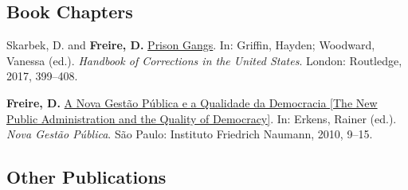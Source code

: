 \documentclass[a4paper]{article}
\renewenvironment{itemize}{
	\begin{list}{}{
			\setlength{\leftmargin}{1.5em}
		}
		}{
	\end{list}
}
\begin{document}
\subsection*{Book Chapters}

\begin{itemize}
\item Skarbek, D. and \textbf{Freire, D.} \href{https://osf.io/kuqqx/}{Prison Gangs}. In: Griffin, Hayden; Woodward, Vanessa (ed.). \textit{Handbook of Corrections in the United States}. London: Routledge, 2017, 399--408.
\item \textbf{Freire, D.} \href{https://fnst.org/sites/default/files/uploads/2017/12/08/ngp.pdf}{A Nova Gest\~{a}o P\'{u}blica e a Qualidade da Democracia {[}The New Public Administration and the Quality of Democracy{]}}. In: Erkens, Rainer (ed.). \textit{Nova Gest\~{a}o P\'{u}blica}. S\~{a}o Paulo: Instituto Friedrich Naumann, 2010, 9--15.
\end{itemize}

\subsection*{Other Publications}
\end{document}

